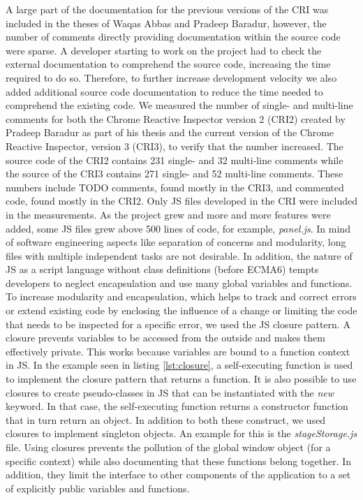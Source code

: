 A large part of the documentation for the previous versions of the CRI was included in the theses of Waqas Abbas and Pradeep Baradur, however, the number of comments directly providing documentation within the source code were sparse. A developer starting to work on the project had to check the external documentation to comprehend the source code, increasing the time required to do so. Therefore, to further increase development velocity we also added additional source code documentation to reduce the time needed to comprehend the existing code. We measured the number of single- and multi-line comments for both the Chrome Reactive Inspector version 2 (CRI2) created by Pradeep Baradur as part of his thesis and the current version of the Chrome Reactive Inspector, version 3 (CRI3), to verify that the number increased. The source code of the CRI2 contains 231 single- and 32 multi-line comments while the source of the CRI3 contains 271 single- and 52 multi-line comments. These numbers include TODO comments, found mostly in the CRI3, and commented code, found mostly in the CRI2. Only JS files developed in the CRI were included in the measurements. 
As the project grew and more and more features were added, some JS files grew above 500 lines of code, for example, \emph{panel.js}. In mind of software engineering aspects like separation of concerns and modularity, long files with multiple independent tasks are not desirable. In addition, the nature of JS as a script language without class definitions (before ECMA6) tempts developers to neglect encapsulation and use many global variables and functions. To increase modularity and encapsulation, which helps to track and correct errors or extend existing code by enclosing the influence of a change or limiting the code that needs to be inspected for a specific error, we used the JS closure pattern. A closure prevents variables to be accessed from the outside and makes them effectively private. This works because variables are bound to a function context in JS. In the example seen in listing \ref{lst:closure}, a self-executing function is used to implement the closure pattern that returns a function. It is also possible to use closures to create pseudo-classes in JS that can be instantiated with the \emph{new} keyword. In that case, the self-executing function returns a constructor function that in turn return an object. In addition to both these construct, we used closures to implement singleton objects. An example for this is the \emph{stageStorage.js} file. Using closures prevents the pollution of the global window object (for a specific context) while also documenting that these functions belong together. In addition, they limit the interface to other components of the application to a set of explicitly public variables and functions.
